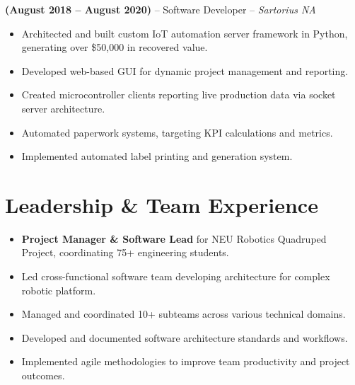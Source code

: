 \documentclass[11pt,a4paper]{article}
\newcommand{\jobentry}[2]{
  \vspace{0.5\baselineskip}\textbf{#1} -- #2 
}
\begin{document}
\jobentry{(August 2018 -- August 2020)}{Software Developer -- \textit{Sartorius NA}}
\begin{itemize}
\item Architected and built custom IoT automation server framework in Python, generating over \$50,000 in recovered value.
\item Developed web-based GUI for dynamic project management and reporting.
\item Created microcontroller clients reporting live production data via socket server architecture.
\item Automated paperwork systems, targeting KPI calculations and metrics.
\item Implemented automated label printing and generation system.
\end{itemize}

\section*{Leadership \& Team Experience}
\begin{itemize}
\item \textbf{Project Manager \& Software Lead} for NEU Robotics Quadruped Project, coordinating 75+ engineering students.
\item Led cross-functional software team developing architecture for complex robotic platform.
\item Managed and coordinated 10+ subteams across various technical domains.
\item Developed and documented software architecture standards and workflows.
\item Implemented agile methodologies to improve team productivity and project outcomes.
\end{itemize}
\end{document}
